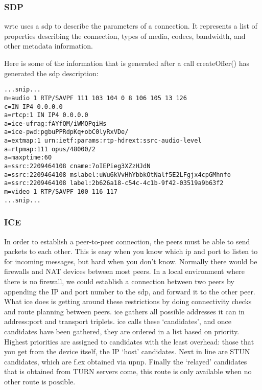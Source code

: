 \subsubsection{SDP}
\gls{wrtc} uses a \gls{sdp} to describe the parameters of a connection. It represents a list of properties describing the connection, types of media, codecs, bandwidth, and other metadata information.

Here is some of the information that is generated after a call createOffer() has generated the \gls{sdp} description:

\begin{lstlisting}[frame=single]
...snip...
m=audio 1 RTP/SAVPF 111 103 104 0 8 106 105 13 126
c=IN IP4 0.0.0.0
a=rtcp:1 IN IP4 0.0.0.0
a=ice-ufrag:fAYfQM/iWMQPqiHs
a=ice-pwd:pgbuPPRdpKq+obC0lyRxVDe/
a=extmap:1 urn:ietf:params:rtp-hdrext:ssrc-audio-level
a=rtpmap:111 opus/48000/2
a=maxptime:60
a=ssrc:2209464108 cname:7oIEPieg3XZzHJdN
a=ssrc:2209464108 mslabel:uWu6kVvHhYbbkOtNalf5E2LFgjx4cpGMhnfo
a=ssrc:2209464108 label:2b626a18-c54c-4c1b-9f42-03519a9b63f2
m=video 1 RTP/SAVPF 100 116 117
...snip...
\end{lstlisting}


\subsubsection{ICE}
In order to establish a peer-to-peer connection, the peers must be able to send packets to each other. This is easy when you know which ip and port to listen to for incoming messages, but hard when you don't know. Normally there would be firewalls and NAT devices between most peers. In a local environment where there is no firewall, we could establish a connection between two peers by appending the IP and port number to the \gls{sdp}, and forward it to the other peer. What \gls{ice} does is getting around these restrictions by doing connectivity checks and route planning between peers. \gls{ice} gathers all possible addresses it can in address:port and transport triplets\cite{Ivov2013Ice}. \gls{ice} calls these `candidates', and once candidates have been gathered, they are ordered in a list based on priority. Highest priorities are assigned to candidates with the least overhead: those that you get from the device itself, the IP `host' candidates. Next in line are STUN candidates, which are f.ex obtained via \gls{upnp}. Finally the `relayed' candidates that is obtained from TURN servers come, this route is only available when no other route is possible.


